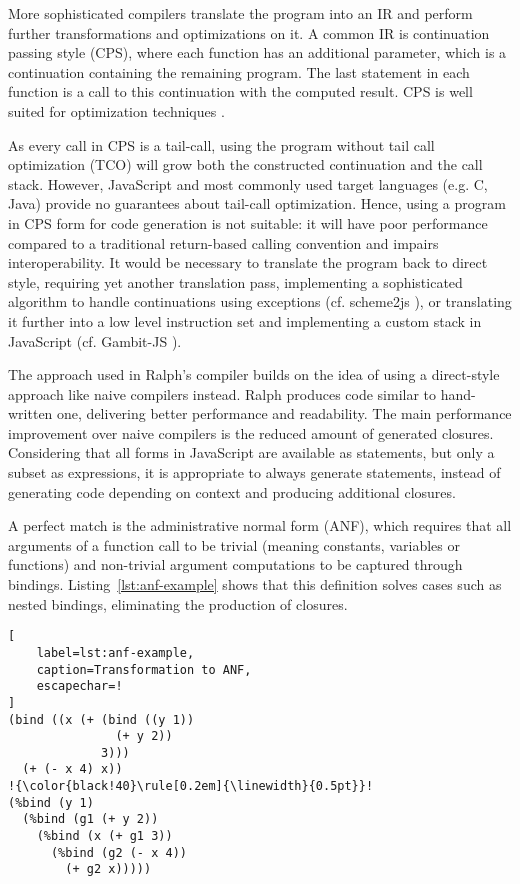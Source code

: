 \documentclass{acm_proc_article-sp}
\begin{document}
More sophisticated compilers translate the program into an IR and
perform further transformations and optimizations on it. A common IR
is continuation passing style \cite{sussman75scheme} (CPS), where each
function has an additional parameter, which is a continuation
containing the remaining program. The last statement in each function
is a call to this continuation with the computed result. CPS is
well suited for optimization techniques \cite{kennedy2007}.

As every call in CPS is a tail-call, using the program without tail
call optimization (TCO) will grow both the constructed continuation
and the call stack. However, JavaScript and most commonly used target
languages (e.g. C, Java) provide no guarantees about tail-call
optimization. Hence, using a program in CPS form for code generation
is not suitable: it will have poor performance compared to a
traditional return-based calling convention and impairs
interoperability. It would be necessary to translate the program back
to direct style, requiring yet another translation pass, implementing
a sophisticated algorithm to handle continuations using exceptions
(cf. scheme2js \cite{loitsch2009scm2js}), or translating it further
into a low level instruction set and implementing a custom stack in
JavaScript (cf. Gambit-JS \cite{thivierge2012}).

The approach used in Ralph's compiler builds on the idea of using a
direct-style approach like naive compilers instead. Ralph produces
code similar to hand-written one, delivering better performance and
readability. The main performance improvement over naive compilers is
the reduced amount of generated closures. Considering that all forms
in JavaScript are available as statements, but only a subset as
expressions, it is appropriate to always generate statements, instead
of generating code depending on context and producing additional
closures.

A perfect match is the administrative normal form \cite{flanagan1993}
(ANF), which requires that all arguments of a function call to be
trivial (meaning constants, variables or functions) and non-trivial
argument computations to be captured through bindings.
Listing~\ref{lst:anf-example} shows that this definition solves cases
such as nested bindings, eliminating the production of closures.

\begin{lstlisting}[
    label=lst:anf-example,
    caption=Transformation to ANF,
    escapechar=!
]
(bind ((x (+ (bind ((y 1))
               (+ y 2))
             3)))
  (+ (- x 4) x))
!{\color{black!40}\rule[0.2em]{\linewidth}{0.5pt}}!
(%bind (y 1)
  (%bind (g1 (+ y 2))
    (%bind (x (+ g1 3))
      (%bind (g2 (- x 4))
        (+ g2 x)))))
\end{lstlisting}
\end{document}
